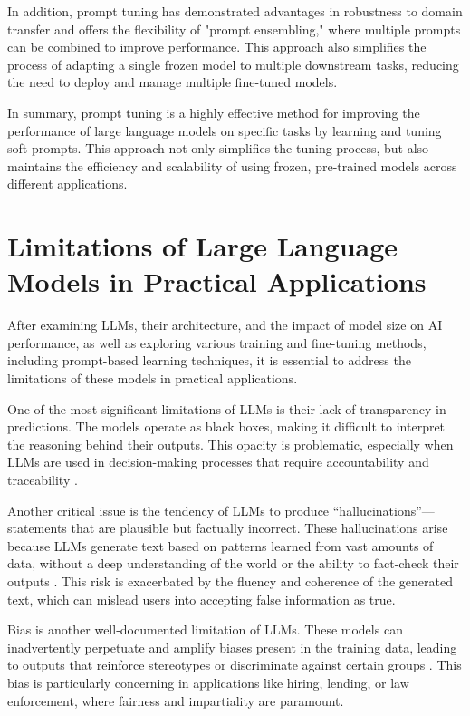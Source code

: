 In addition, prompt tuning has demonstrated advantages in robustness to domain transfer and offers the flexibility of "prompt ensembling," where multiple prompts can be combined to improve performance. This approach also simplifies the process of adapting a single frozen model to multiple downstream tasks, reducing the need to deploy and manage multiple fine-tuned models. \cite{lester2021power}

In summary, prompt tuning is a highly effective method for improving the performance of large language models on specific tasks by learning and tuning soft prompts. This approach not only simplifies the tuning process, but also maintains the efficiency and scalability of using frozen, pre-trained models across different applications. 

\section{Limitations of Large Language Models in Practical Applications}

After examining LLMs, their architecture, and the impact of model size on AI performance, as well as exploring various training and fine-tuning methods, including prompt-based learning techniques, it is essential to address the limitations of these models in practical applications.

One of the most significant limitations of LLMs is their lack of transparency in predictions. The models operate as black boxes, making it difficult to interpret the reasoning behind their outputs. This opacity is problematic, especially when LLMs are used in decision-making processes that require accountability and traceability \cite{rudin2019stop}.

Another critical issue is the tendency of LLMs to produce “hallucinations”—statements that are plausible but factually incorrect. These hallucinations arise because LLMs generate text based on patterns learned from vast amounts of data, without a deep understanding of the world or the ability to fact-check their outputs \cite{maynez2020faithfulness}. This risk is exacerbated by the fluency and coherence of the generated text, which can mislead users into accepting false information as true.

Bias is another well-documented limitation of LLMs. These models can inadvertently perpetuate and amplify biases present in the training data, leading to outputs that reinforce stereotypes or discriminate against certain groups \cite{bender2021dangers}. This bias is particularly concerning in applications like hiring, lending, or law enforcement, where fairness and impartiality are paramount.

